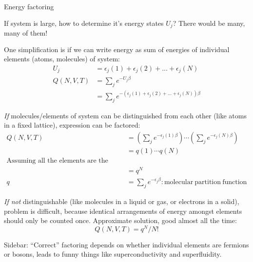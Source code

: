 \documentclass[11pt]{article}
\begin{document}
\begin{outline}
\begin{outline}
\item{Energy factoring}
  \begin{outline}
  \item{If system is large, how to determine it's energy states $U_j$?  There
      would be many, many of them!}
  \item{One simplification is if we can write energy as sum of energies of
      individual elements (atoms, molecules) of system:}
    \begin{align}
      U_j&=\epsilon_j(1)+\epsilon_j(2) + ... + \epsilon_j(N) \\
      Q(N,V,T) &= \sum_j e^{-U_j\beta} \\
      &=\sum_je^{-(\epsilon_j(1)+\epsilon_j(2) + ... + \epsilon_j(N))\beta}
    \end{align}
    \begin{outline}
    \item{{\em If} molecules/elements of system can be distinguished from each
        other (like atoms in a fixed lattice), expression can be factored:}
      \begin{align}
        Q(N,V,T)&=\left ( \sum_j e^{-\epsilon_j(1)\beta}\right )\cdots \left ( \sum_j
          e^{-\epsilon_j(N)\beta}\right ) \\
      &= q(1)\cdots q(N) \\
      \text{Assuming all the elements are the same:}\\
      &= q^N \\
     q&=\sum_j e^{-\epsilon_j \beta}: \mathrm{molecular\ partition\ function}
   \end{align}
  \item{{\em If not} distinguishable (like molecules in a liquid or gas, or
      electrons in a solid), problem is difficult, because identical
      arrangements of energy amongst elements should only be counted once.
      Approximate solution, good almost all the time:}
    \begin{equation}
      Q(N,V,T)=q^N/N!
    \end{equation}
  \item{Sidebar: ``Correct'' factoring depends on whether individual elements
      are fermions or bosons, leads to funny things like superconductivity and
      superfluidity.}
  \end{outline}
\end{outline}


\end{outline}
\end{outline}
\end{document}
